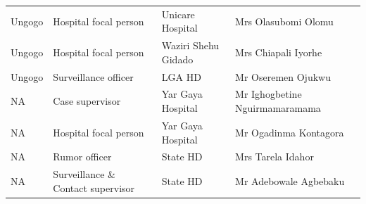 \documentclass[a4paper, titlepage]{tufte-handout}
\begin{document}
\begin{table}
\begin{tabular}{l|l|l|l}
Ungogo & Hospital focal person & Unicare Hospital & Mrs Olasubomi Olomu\\
Ungogo & Hospital focal person & Waziri Shehu Gidado & Mrs Chiapali Iyorhe\\
Ungogo & Surveillance officer & LGA HD & Mr Oseremen Ojukwu\\
NA & Case supervisor & Yar Gaya Hospital & Mr Ighogbetine Nguirmamaramama\\
NA & Hospital focal person & Yar Gaya Hospital & Mr Ogadinma Kontagora\\
NA & Rumor officer & State HD & Mrs Tarela Idahor\\
NA & Surveillance \& Contact supervisor & State HD & Mr Adebowale Agbebaku\\
\bottomrule
\end{tabular}
\end{table}
\end{document}
